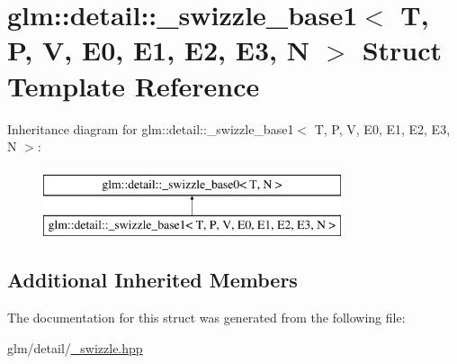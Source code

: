 \hypertarget{structglm_1_1detail_1_1__swizzle__base1}{\section{glm\-:\-:detail\-:\-:\-\_\-swizzle\-\_\-base1$<$ T, P, V, E0, E1, E2, E3, N $>$ Struct Template Reference}
\label{structglm_1_1detail_1_1__swizzle__base1}
}
Inheritance diagram for glm\-:\-:detail\-:\-:\-\_\-swizzle\-\_\-base1$<$ T, P, V, E0, E1, E2, E3, N $>$\-:\begin{figure}[H]
\begin{center}
\leavevmode
\includegraphics[height=2.000000cm]{structglm_1_1detail_1_1__swizzle__base1}
\end{center}
\end{figure}
\subsection*{Additional Inherited Members}


The documentation for this struct was generated from the following file\-:\begin{DoxyCompactItemize}
\item 
glm/detail/\hyperlink{__swizzle_8hpp}{\-\_\-swizzle.\-hpp}\end{DoxyCompactItemize}
